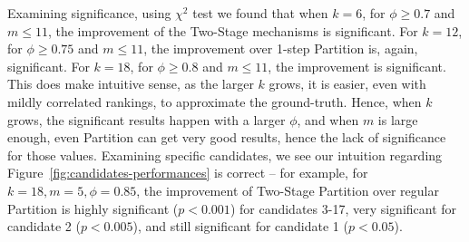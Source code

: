 \documentclass[letterpaper]{article}
\begin{document}
Examining significance, using $\chi^{2}$ test we found that when $k= 6$, for $\phi\geq 0.7$ and $m\leq 11$, the improvement of the Two-Stage mechanisms is significant. For $k=12$, for $\phi\geq 0.75$ and $m\leq 11$, the improvement over 1-step Partition is, again, significant. For $k= 18$, for $\phi\geq 0.8$ and $m\leq 11$, the improvement is significant. This does make intuitive sense, as the larger $k$ grows, it is easier, even with mildly correlated rankings, to approximate the ground-truth. Hence, when $k$ grows, the significant results happen with a larger $\phi$, and when $m$ is large enough, even Partition can get very good results, hence the lack of significance for those values. Examining specific candidates, we see our intuition regarding Figure~\ref{fig:candidates-performances} is correct -- for example, for $k=18, m=5, \phi=0.85$, the improvement of Two-Stage Partition over regular Partition is highly significant ($p<0.001$) for candidates 3-17, very significant for candidate 2 ($p<0.005$), and still significant for candidate 1 ($p<0.05$).
\end{document}
